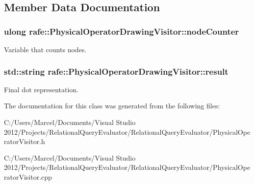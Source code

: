 \subsection{Member Data Documentation}
\hypertarget{classrafe_1_1_physical_operator_drawing_visitor_a657ec262f628b93a56bb9ed016d02568}{
\subsubsection[{node\+Counter}]{\setlength{\rightskip}{0pt plus 5cm}ulong rafe\+::\+Physical\+Operator\+Drawing\+Visitor\+::node\+Counter}}\label{classrafe_1_1_physical_operator_drawing_visitor_a657ec262f628b93a56bb9ed016d02568}
Variable that counts nodes. \hypertarget{classrafe_1_1_physical_operator_drawing_visitor_a1e0b2d80743e6a11b4a75af0f68157d8}{
\subsubsection[{result}]{\setlength{\rightskip}{0pt plus 5cm}std\+::string rafe\+::\+Physical\+Operator\+Drawing\+Visitor\+::result}}\label{classrafe_1_1_physical_operator_drawing_visitor_a1e0b2d80743e6a11b4a75af0f68157d8}
Final dot representation. 

The documentation for this class was generated from the following files\+:\begin{DoxyCompactItemize}
\item 
C\+:/\+Users/\+Marcel/\+Documents/\+Visual Studio 2012/\+Projects/\+Relational\+Query\+Evaluator/\+Relational\+Query\+Evaluator/Physical\+Operator\+Visitor.\+h\item 
C\+:/\+Users/\+Marcel/\+Documents/\+Visual Studio 2012/\+Projects/\+Relational\+Query\+Evaluator/\+Relational\+Query\+Evaluator/Physical\+Operator\+Visitor.\+cpp\end{DoxyCompactItemize}

